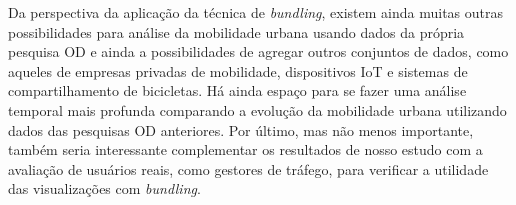 Da perspectiva da aplicação da técnica de \emph{bundling}, existem ainda muitas
outras possibilidades para análise da mobilidade urbana usando dados da própria
pesquisa OD e ainda a possibilidades de agregar outros conjuntos de dados, como
aqueles de empresas privadas de mobilidade, dispositivos IoT e sistemas de
compartilhamento de bicicletas. Há ainda espaço para se fazer uma análise
temporal mais profunda comparando a evolução da mobilidade urbana utilizando
dados das pesquisas OD anteriores. Por último, mas não menos importante, também
seria interessante complementar os resultados de nosso estudo com a avaliação de
usuários reais, como gestores de tráfego, para verificar a utilidade das
visualizações com \emph{bundling}.






